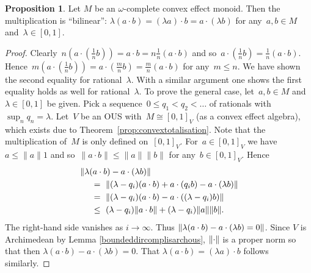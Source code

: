 \documentclass[10pt,conference]{IEEEtran}
\DeclarePairedDelimiter{\norm}{\lVert}{\rVert}
\newcounter{counter}
\theoremstyle{definition}
\newtheorem{proposition}[counter]{Proposition}
\begin{document}
\begin{proposition}\label{prop:multiplicationisbilinear}
    Let $M$ be an $\omega$-complete convex effect monoid.
    Then the multiplication is ``bilinear'':
    $\lambda(a\cdot b) = (\lambda a)\cdot b = a\cdot (\lambda
    b)$ for any~$a,b\in M$ and~$\lambda \in [0,1]$.
\end{proposition}
\begin{proof}
    Clearly~$n(a\cdot (\frac1n b)) = a\cdot b = n \frac1n (a\cdot b)$
        and so~$a\cdot (\frac1n b) = \frac1n (a \cdot b)$.
    Hence~$m (a \cdot (\frac 1n b )) = a\cdot (\frac mn b)
            = \frac mn (a \cdot b)$ for any~$m \leq n$.
    We have shown the second equality for rational~$\lambda$.
    With a similar argument one shows the first equality holds
        as well for rational~$\lambda$.
    To prove the general case, 
        let~$a,b \in M$ and~$\lambda \in [0,1]$ be given.
    Pick a sequence~$0 \leq q_1 < q_2 < \ldots $ of rationals
        with~$\sup_n q_n = \lambda$.
    Let~$V$ be an OUS with~$M \cong [0,1]_V$ (as a convex effect algebra),
        which exists due to Theorem~\ref{prop:convextotalisation}.
    Note that the multiplication of~$M$ is only defined on~$[0,1]_V$.
    For~$a \in[0,1]_V$ we have~$a \leq \| a \| 1$
        and so~$\| a \cdot b \| \leq \| a \| \| b \|$ for any~$b \in [0,1]_V$.
        Hence
        \begin{align*}
            &\norm{\lambda (a\cdot b) - a\cdot (\lambda b)} \\
            &\quad \ =\  \norm{(\lambda - q_i)(a\cdot b) + a\cdot (q_i b) - a\cdot (\lambda b)} \\
        &\quad\ =\  \norm{(\lambda-q_i)(a\cdot b) - a\cdot ((\lambda - q_i)b)} \\
        &\quad\ \leq\  (\lambda-q_i)\norm{a\cdot b} + (\lambda-q_i)\norm{a}\norm{b}.
        \end{align*}
        The right-hand side vanishes
            as $i\rightarrow \infty$.
            Thus $\norm{\lambda(a\cdot b) - {a\cdot (\lambda b)}=0}$.
            Since $V$ is Archimedean by Lemma \ref{boundeddircomplisarchous}, $\norm{\cdot}$
            is a proper norm so that then $\lambda(a\cdot b) - a\cdot (\lambda b) = 0$. That $\lambda(a\cdot b) = (\lambda a)\cdot b$ follows similarly.
\end{proof}
% 
\end{document}
